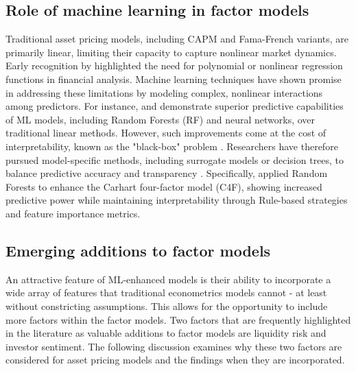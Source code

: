 \subsection{Role of machine learning in factor models}

Traditional asset pricing models, including CAPM and Fama-French variants, are primarily linear, limiting their capacity to capture nonlinear market dynamics. Early recognition by  highlighted the need for polynomial or nonlinear regression functions in financial analysis. Machine learning techniques have shown promise in addressing these limitations by modeling complex, nonlinear interactions among predictors. For instance,  and  demonstrate superior predictive capabilities of ML models, including Random Forests (RF) and neural networks, over traditional linear methods. However, such improvements come at the cost of interpretability, known as the "black-box" problem \cite{brozek_2024}. Researchers have therefore pursued model-specific methods, including surrogate models or decision trees, to balance predictive accuracy and transparency \cite{simonian_2019}. Specifically,  applied Random Forests to enhance the Carhart four-factor model (C4F), showing increased predictive power while maintaining interpretability through Rule-based strategies and feature importance metrics.

\subsection{Emerging additions to factor models}
An attractive feature of ML-enhanced models is their ability to incorporate a wide array of features that traditional econometrics models cannot - at least without constricting assumptions. This allows for the opportunity to include more factors within the factor models. Two factors that are frequently highlighted in the literature as valuable additions to factor models are liquidity risk and investor sentiment. The following discussion examines why these two factors are considered for asset pricing models and the findings when they are incorporated.


